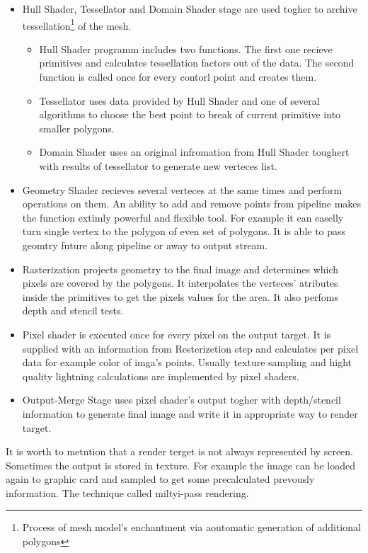 \documentclass[twoside, english, 11pt]{report}
\begin{document}
\begin{itemize}
\item Hull Shader, Tessellator and Domain Shader stage are used togher to archive tessellation\footnote{Process of mesh model's enchantment via aoutomatic generation of additional polygons} of the mesh.
  \begin{itemize}
    \item Hull Shader programm includes two functions. The first one recieve primitives and calculates tessellation factors out of the data. The second function is called once for every contorl point and creates them.
    \item Tessellator uses data provided by Hull Shader and one of several algorithms to choose the best point to break of current primitive into smaller polygons.
    \item Domain Shader uses an original infromation from Hull Shader toughert with results of tessellator to generate new verteces list.
  \end{itemize}
\item Geometry Shader recieves several verteces at the same times and perform operations on them. An ability to add and remove points from pipeline makes the function extimly powerful and flexible tool. For example it can easelly turn single vertex to the polygon of even set of polygons. It is able to pass geomtry future along pipeline or away to output stream.
\item Rasterization projects geometry to the final image and determines which pixels are covered by the polygons. It interpolates the verteces' atributes inside the primitives to get the pixels values for the area. It also perfoms depth and stencil tests.
\item Pixel shader is executed once for every pixel on the output target. It is supplied with an information from Resterizetion step and calculates per pixel data for example color of imga's points. Usually texture sampling and hight quality lightning calculations are implemented by pixel shaders.
\item Output-Merge Stage uses pixel shader's output togher with depth/stencil information to generate final image and write it in appropriate way to render target.
\end{itemize}

It is worth to metntion that a render terget is not always represented by screen. Sometimes the output is stored in texture. For example the image can be loaded again to graphic card and sampled to get some precalculated prevously information. The technique called miltyi-pass rendering.
\end{document}
